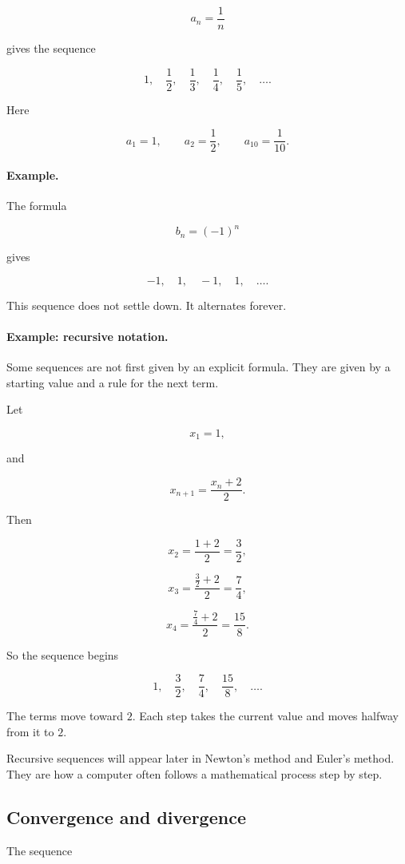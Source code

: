 \[
a_n=\frac1n
\]

gives the sequence

\[
1,\quad \frac12,\quad \frac13,\quad \frac14,\quad \frac15,\quad \ldots.
\]

Here

\[
a_1=1,
\qquad
a_2=\frac12,
\qquad
a_{10}=\frac1{10}.
\]

\paragraph{Example.}
The formula

\[
b_n=(-1)^n
\]

gives

\[
-1,\quad 1,\quad -1,\quad 1,\quad \ldots.
\]

This sequence does not settle down.  It alternates forever.

\paragraph{Example: recursive notation.}
Some sequences are not first given by an explicit formula.  They are given by a starting value and a rule for the next term.

Let

\[
x_1=1,
\]

and

\[
x_{n+1}=\frac{x_n+2}{2}.
\]

Then

\[
x_2=\frac{1+2}{2}=\frac32,
\]

\[
x_3=\frac{\frac32+2}{2}=\frac74,
\]

\[
x_4=\frac{\frac74+2}{2}=\frac{15}{8}.
\]

So the sequence begins

\[
1,\quad \frac32,\quad \frac74,\quad \frac{15}{8},\quad \ldots.
\]

The terms move toward \(2\).  Each step takes the current value and moves halfway from it to \(2\).

Recursive sequences will appear later in Newton's method and Euler's method.  They are how a computer often follows a mathematical process step by step.

\subsection{Convergence and divergence}
\label{subsec:sequence-convergence-divergence}

The sequence

